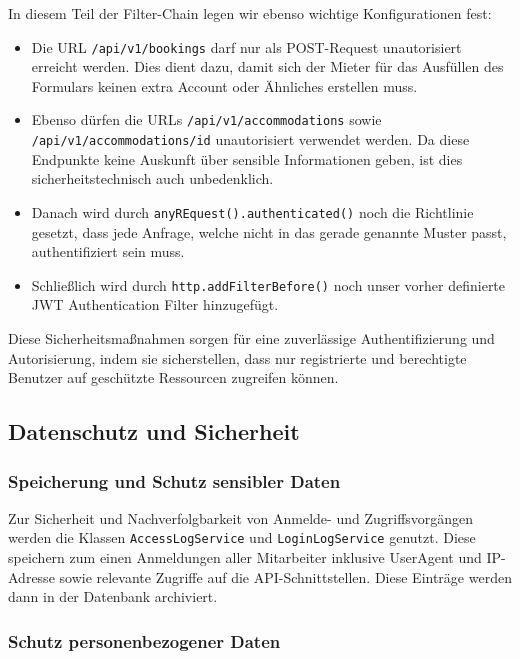 				In diesem Teil der Filter-Chain legen wir ebenso wichtige Konfigurationen fest:
				
				\begin{itemize}
					\item Die URL \texttt{/api/v1/bookings} darf nur als POST-Request unautorisiert erreicht werden. Dies dient dazu, damit sich der Mieter für das Ausfüllen des Formulars keinen extra Account oder Ähnliches erstellen muss.
					\item Ebenso dürfen die URLs \texttt{/api/v1/accommodations} sowie \texttt{/api/v1/accommodations/{id}} unautorisiert verwendet werden. Da diese Endpunkte keine Auskunft über sensible Informationen geben, ist dies sicherheitstechnisch auch unbedenklich.
					\item Danach wird durch \texttt{anyREquest().authenticated()} noch die Richtlinie gesetzt, dass jede Anfrage, welche nicht in das gerade genannte Muster passt, authentifiziert sein muss. 
					\item Schließlich wird durch \texttt{http.addFilterBefore()} noch unser vorher definierte JWT Authentication Filter hinzugefügt.
				\end{itemize}
				
				Diese Sicherheitsmaßnahmen sorgen für eine zuverlässige Authentifizierung und Autorisierung, indem sie sicherstellen, dass nur registrierte und berechtigte Benutzer auf geschützte Ressourcen zugreifen können.
				\subsection{Datenschutz und Sicherheit}
				
				\subsubsection{Speicherung und Schutz sensibler Daten}
				
				Zur Sicherheit und Nachverfolgbarkeit von Anmelde- und Zugriffsvorgängen werden die Klassen \texttt{AccessLogService} und \texttt{LoginLogService} genutzt. Diese speichern zum einen Anmeldungen aller Mitarbeiter inklusive UserAgent und IP-Adresse sowie relevante Zugriffe auf die API-Schnittstellen. Diese Einträge werden dann in der Datenbank archiviert.
				
				\subsubsection{Schutz personenbezogener Daten}
				
